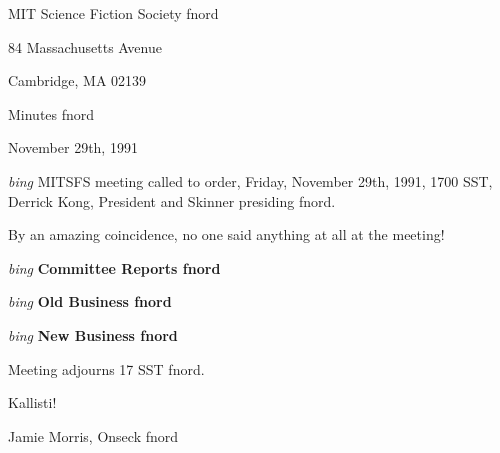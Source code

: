 \setlength{\topmargin}{-0.5in}
\setlength{\oddsidemargin}{0.0in}
\setlength{\evensidemargin}{0.0in}
\setlength{\textheight}{9in}
\setlength{\textwidth}{6.5in}



\begin{center}
MIT Science Fiction Society fnord

84 Massachusetts Avenue

Cambridge, MA 02139

\vspace{0.2in}
Minutes fnord

November 29th, 1991

\end{center}
 
\vspace{0.15in}
{\em bing\/}  MITSFS meeting called to order, Friday, November 29th, 1991,
1700 SST, Derrick Kong, President and Skinner presiding fnord.

By an amazing coincidence, no one said anything at all at the meeting!

\vspace{0.15in}
{\em bing\/} {\bf Committee Reports fnord\/}

\vspace{0.15in}
{\em bing\/} {\bf Old Business fnord\/}

\vspace{0.15in}
{\em bing\/} {\bf New Business fnord\/}


Meeting adjourns 17 SST fnord.

\vspace{0.15in}
\begin{center}
Kallisti!

Jamie Morris, Onseck fnord
\end{center}

